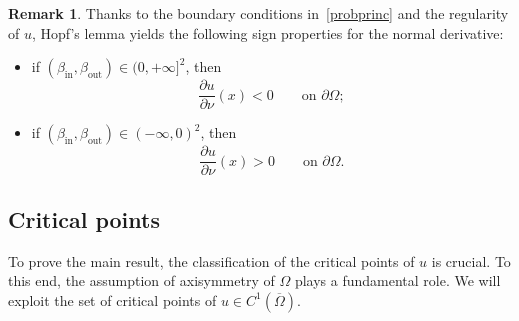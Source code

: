 \documentclass[oneside,a4paper,11pt,notitlepage]{article}
\theoremstyle{plain}
\numberwithin{teor}{section}
\numberwithin{equation}{section}
\theoremstyle{definition}
\theoremstyle{plain}
\theoremstyle{plain}
\theoremstyle{plain}
\theoremstyle{plain}
\theoremstyle{definition}
\theoremstyle{definition}
\newtheorem{oss}[oss]{Remark}
\theoremstyle{plain}
\begin{document}
\begin{oss}\label{hopf}
Thanks to the boundary conditions in~\eqref{probprinc} and the regularity of $u$,
Hopf's lemma yields the following sign properties for the normal derivative:
\begin{itemize}
    \item if $(\beta_{\mathrm{in}}, \beta_{\mathrm{out}}) \in (0,+\infty]^2$, then
    \[
    \frac{\partial u}{\partial \nu}(x) < 0
    \qquad \text{on } \partial \Omega;
    \]
    \item if $(\beta_{\mathrm{in}}, \beta_{\mathrm{out}}) \in (-\infty,0)^2$, then
    \[
    \frac{\partial u}{\partial \nu}(x) > 0
    \qquad \text{on } \partial \Omega.
    \]
\end{itemize}
\end{oss}

\subsection{Critical points}
To prove the main result, the classification of the critical points of $u$ is crucial. To this end, the assumption of axisymmetry of $\Omega$ plays a fundamental role. We will exploit the set of critical points of $u \in C^{1}(\overline \Omega)$. 
\end{document}
